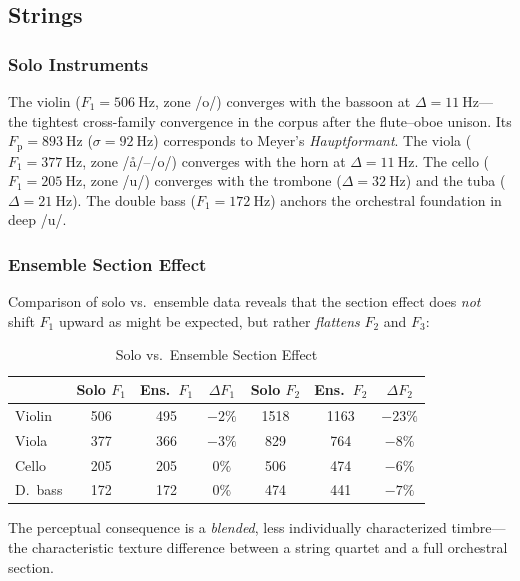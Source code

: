 \documentclass[journal]{IEEEtran}
\newcommand{\Fp}{F_\mathrm{p}}
\newcommand{\Fn}[1]{F_{#1}}
\begin{document}
\subsection{Strings}

\subsubsection{Solo Instruments}
The violin ($\Fn{1} = \SI{506}{\hertz}$, zone /o/) converges with the bassoon at $\Delta = \SI{11}{\hertz}$---the tightest cross-family convergence in the corpus after the flute--oboe unison. Its $\Fp = \SI{893}{\hertz}$ ($\sigma = \SI{92}{\hertz}$) corresponds to Meyer's \emph{Hauptformant}. The viola ($\Fn{1} = \SI{377}{\hertz}$, zone /\aa/--/o/) converges with the horn at $\Delta = \SI{11}{\hertz}$. The cello ($\Fn{1} = \SI{205}{\hertz}$, zone /u/) converges with the trombone ($\Delta = \SI{32}{\hertz}$) and the tuba ($\Delta = \SI{21}{\hertz}$). The double bass ($\Fn{1} = \SI{172}{\hertz}$) anchors the orchestral foundation in deep /u/.

\subsubsection{Ensemble Section Effect}
Comparison of solo vs.\ ensemble data reveals that the section effect does \emph{not} shift $\Fn{1}$ upward as might be expected, but rather \emph{flattens} $\Fn{2}$ and $\Fn{3}$:

\begin{table}[!t]
\centering
\caption{Solo vs.\ Ensemble Section Effect}
\label{tab:section}
\begin{tabular}{@{}lS[table-format=3.0]S[table-format=3.0]cS[table-format=4.0]S[table-format=4.0]c@{}}
\toprule
 & {Solo $\Fn{1}$} & {Ens.\ $\Fn{1}$} & {$\Delta\Fn{1}$} & {Solo $\Fn{2}$} & {Ens.\ $\Fn{2}$} & {$\Delta\Fn{2}$} \\
\midrule
Violin & 506  & 495  & $-2\%$  & 1518 & 1163 & $-23\%$ \\
Viola  & 377  & 366  & $-3\%$  & 829  & 764  & $-8\%$  \\
Cello  & 205  & 205  & $0\%$   & 506  & 474  & $-6\%$  \\
D.~bass & 172 & 172  & $0\%$   & 474  & 441  & $-7\%$  \\
\bottomrule
\end{tabular}
\end{table}

The perceptual consequence is a \emph{blended}, less individually characterized timbre---the characteristic texture difference between a string quartet and a full orchestral section.
\end{document}
